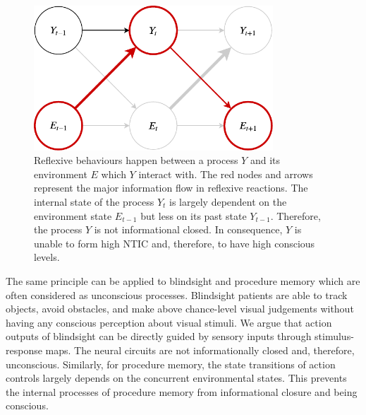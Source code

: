 \documentclass[utf8]{article}
\begin{document}
        		\begin{figure}[H]
        			\includegraphics[width=0.8\textwidth]{WritingMaterials/Fig_Reflexive/Reflexive.pdf}
        			\caption{
        			    Reflexive behaviours happen between a process $Y$ and its environment $E$ which $Y$ interact with. The red nodes and arrows represent the major information flow in reflexive reactions. The internal state of the process $Y_t$ is largely dependent on the environment state $E_{t-1}$ but less on its past state $Y_{t-1}$. Therefore, the process $Y$ is not informational closed. In consequence, $Y$ is unable to form high NTIC and, therefore, to have high conscious levels.
        			    }
        			\label{fig:reflexive}
        		\end{figure}  
        		
        		The same principle can be applied to blindsight \citep{humphrey1999history, humphrey1974vision, Humphrey1970} and procedure memory \citep{doyon2009contributions, ashby2010cortical} which are often considered as unconscious processes. Blindsight patients are able to track objects, avoid obstacles, and make above chance-level visual judgements without having any conscious perception about visual stimuli. We argue that action outputs of blindsight can be directly guided by sensory inputs through stimulus-response maps. The neural circuits are not informationally closed and, therefore, unconscious. Similarly, for procedure memory, the state transitions of action controls largely depends on the concurrent environmental states. This prevents the internal processes of procedure memory from informational closure and being conscious. 
         
                
\end{document}
